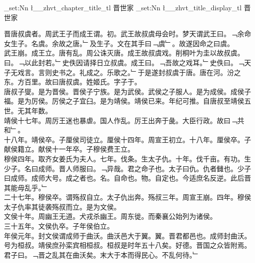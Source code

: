 \documentclass{zhvt-classic}
\begin{document}
\clearpage
\ExplSyntaxOn
\tl_set:Nn \l__zhvt_chapter_title_tl { 晋世家 }
\tl_set:Nn \l__zhvt_title_display_tl { 晋世家 }
\ExplSyntaxOff
\maketitle


\hspace*{2em}晋唐叔虞者。周武王子而成王谓。初。武王故叔虞母会时。梦天谓武王曰。﹁余命女生子。名虞。余故之唐。﹂及生子。文在其手曰﹁虞﹂。故遂因命之曰虞。\\
\hspace*{2em}武王崩。成王立。唐有乱。周公诛灭唐。成王故叔虞戏。削桐叶为圭以故叔虞。曰。﹁以此封若。﹂史佚因请择日立叔虞。成王曰。﹁吾故之戏耳。﹂史佚曰。﹁天子无戏言。言则史书之。礼成之。乐歌之。﹂于是遂封叔虞于唐。唐在河。汾之东。方百里。故曰唐叔虞。姓姬氏。字子于。\\
\hspace*{2em}唐叔子燮。是为晋侯。晋侯子宁族。是为武侯。武侯之子服人。是为成侯。成侯子福。是为厉侯。厉侯之子宜臼。是为靖侯。靖侯已来。年纪可推。自唐叔至靖侯五世。无其年数。\\
\hspace*{2em}靖侯十七年。周厉王迷也暴虐。国人作乱。厉王出奔于彘。大臣行政。故曰﹁共和﹂。\\
\hspace*{2em}十八年。靖侯卒。子厘侯司徒立。厘侯十四年。周宣王初立。十八年。厘侯卒。子献侯籍立。献侯十一年卒。子穆侯费王立。\\
\hspace*{2em}穆侯四年。取齐女姜氏为夫人。七年。伐条。生太子仇。十年。伐千亩。有功。生少子。名曰成师。晋人师服曰。﹁异哉。君之命子也。太子曰仇。仇者雠也。少子曰成师。成师大号。成之者也。名。自命也。物。自定也。今适庶名反逆。此后晋其能毋乱乎。﹂\\
\hspace*{2em}二十七年。穆侯卒。谓殇叔自立。太子仇出奔。殇叔三年。周宣王崩。四年。穆侯太子仇率其徒袭殇叔而立。是为文侯。\\
\hspace*{2em}文侯十年。周幽王无道。犬戎杀幽王。周东徙。而秦襄公始列为诸侯。\\
\hspace*{2em}三十五年。文侯仇卒。子年侯伯立。\\
\hspace*{2em}年侯元年。封文侯谓成师于曲沃。曲沃邑大于翼。翼。晋君都邑也。成师封曲沃。号为桓叔。靖侯庶孙栾宾相桓叔。桓叔是时年五十八矣。好德。晋国之众皆附焉。君子曰。﹁晋之乱其在曲沃矣。末大于本而得民心。不乱何待。﹂\\
\end{document}
